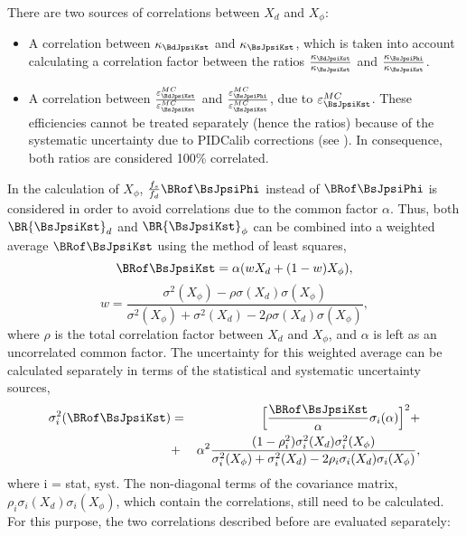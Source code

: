There are two sources of correlations between $X_d$ and $X_\phi$:
\begin{itemize}
\item{} A correlation between $\kappa_{\BdJpsiKst}$ and $\kappa_{\BsJpsiKst}$, which is taken into account calculating a correlation factor between the ratios $\frac{\kappa_{\BdJpsiKst}}{\kappa_{\BsJpsiKst}}$ and $\frac{\kappa_{\BsJpsiPhi}}{\kappa_{\BsJpsiKst}}$.
\item{} A correlation between $\frac{\varepsilon_{\BdJpsiKst}^{MC}}{\varepsilon_{\BsJpsiKst}^{MC}}$
and $\frac{\varepsilon_{\BsJpsiPhi}^{MC}}{\varepsilon_{\BsJpsiKst}^{MC}}$, due to $\varepsilon_{\BsJpsiKst}^{MC}$. These efficiencies cannot be treated separately (hence the ratios) because of the systematic uncertainty due to PIDCalib corrections (see ). In consequence, both ratios are considered 100\% correlated.
\end{itemize}
%
In the calculation of $X_\phi$, $\frac{f_s}{f_d}\BRof\BsJpsiPhi$ instead of $\BRof\BsJpsiPhi$ is considered in order to avoid correlations due to the common factor $\alpha$. Thus, both $\BR{\BsJpsiKst}_{d}$ and $\BR{\BsJpsiKst}_{\phi}$ can be combined into a weighted average $\BRof\BsJpsiKst$ using the method of least squares,
\begin{equation}
\label{eq:weightedB}
\BRof\BsJpsiKst = \alpha(wX_d + (1-w)X_\phi),
\end{equation}
\begin{equation}
\label{eq:theWeight}
w = \frac{\sigma^2(X_\phi) - \rho\sigma(X_d)\sigma(X_\phi)}{\sigma^2(X_\phi) + \sigma^2(X_d) -
2\rho\sigma(X_d)\sigma(X_\phi)},
\end{equation}
%
where $\rho$ is the total correlation factor between $X_d$ and $X_\phi$, and $\alpha$ is left as an uncorrelated common factor. The uncertainty for this weighted average can be calculated separately in terms of the statistical and systematic uncertainty sources,
%
\begin{eqnarray}
\label{eq:theSigmaWeightedB}
\sigma_{i}^2(\BRof\BsJpsiKst) &=& \Big[\frac{\BRof\BsJpsiKst}{\alpha}\sigma_{i}(\alpha)\Big]^2 +
\nonumber\\ &+&
\alpha^2{\frac{(1-\rho_i^2)\sigma_{i}^2(X_d)\sigma_{i}^2(X_\phi)}{\sigma_{i}^2(X_\phi) +
\sigma_{i}^2(X_d) - 2\rho_i\sigma_{i}(X_d)\sigma_{i}(X_\phi)}},
\end{eqnarray}
%
where i = stat, syst. The non-diagonal terms of the covariance matrix, $\rho_i\sigma_{i}(X_d)\sigma_{i}(X_\phi)$, which contain the correlations, still need to be calculated. For this purpose, the two correlations described before are evaluated separately:
